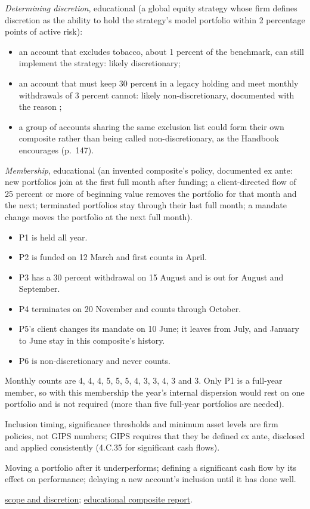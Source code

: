 \begin{qfmethod}
 \emph{Determining discretion}, educational (a global equity strategy whose firm defines discretion as the ability to hold the strategy's model portfolio within 2 percentage points of active risk):
\begin{itemize}
\item an account that excludes tobacco, about 1 percent of the benchmark, can still implement the strategy: likely discretionary;
\item an account that must keep 30 percent in a legacy holding and meet monthly withdrawals of 3 percent cannot: likely non-discretionary, documented with the reason \citep[as described in][Provision 3.A.2, p.~147]{gips-handbook-firms-2020};
\item a group of accounts sharing the same exclusion list could form their own composite rather than being called non-discretionary, as the Handbook encourages (p.~147).
\end{itemize}
\emph{Membership}, educational (an invented composite's policy, documented ex ante: new portfolios join at the first full month after funding; a client-directed flow of 25 percent or more of beginning value removes the portfolio for that month and the next; terminated portfolios stay through their last full month; a mandate change moves the portfolio at the next full month).
\begin{itemize}
\item P1 is held all year.
\item P2 is funded on 12 March and first counts in April.
\item P3 has a 30 percent withdrawal on 15 August and is out for August and September.
\item P4 terminates on 20 November and counts through October.
\item P5's client changes its mandate on 10 June; it leaves from July, and January to June stay in this composite's history.
\item P6 is non-discretionary and never counts.
\end{itemize}
Monthly counts are 4, 4, 4, 5, 5, 5, 4, 3, 3, 4, 3 and 3. Only P1 is a full-year member, so with this membership the year's internal dispersion would rest on one portfolio and is not required (more than five full-year portfolios are needed).

 Inclusion timing, significance thresholds and minimum asset levels are firm policies, not GIPS numbers; GIPS requires that they be defined ex ante, disclosed and applied consistently (4.C.35 for significant cash flows).

 Moving a portfolio after it underperforms; defining a significant cash flow by its effect on performance; delaying a new account's inclusion until it has done well.

 \hyperref[def:gips-scope-verification]{scope and discretion}; \hyperref[ex:gips-composite-report]{educational composite report}.

\end{qfmethod}

